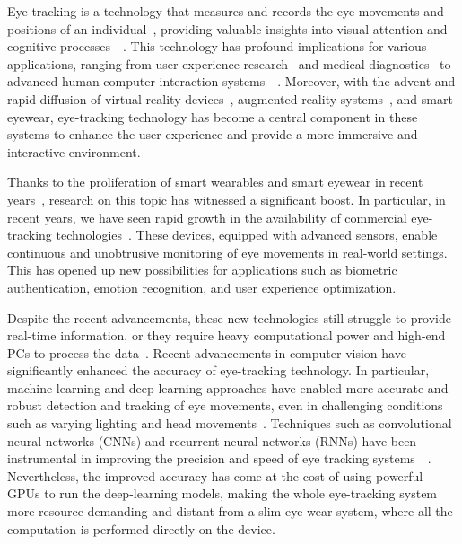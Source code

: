 Eye tracking is a technology that measures and records the eye movements and positions of an individual~\cite{andrychowicz2018basic}, providing valuable insights into visual attention and cognitive processes~\cite{Popa2015Reading}~\cite{Skaramagkas2021Review}. This technology has profound implications for various applications, ranging from user experience research~\cite{Burger2018Suitability} and medical diagnostics~\cite{Liu2021The} to advanced human-computer interaction systems~\cite{Bulling2010Toward}~\cite{Zhang2017Eye}. Moreover, with the advent and rapid diffusion of virtual reality devices~\cite{angelov2020modern}, augmented reality systems~\cite{arena2022overview}, and smart eyewear, eye-tracking technology has become a central component in these systems to enhance the user experience and provide a more immersive and interactive environment.

Thanks to the proliferation of smart wearables and smart eyewear in recent years~\cite{spil2019adoption}, research on this topic has witnessed a significant boost. In particular, in recent years, we have seen rapid growth in the availability of commercial eye-tracking technologies~\cite{KassnerPateraBulling}. These devices, equipped with advanced sensors, enable continuous and unobtrusive monitoring of eye movements in real-world settings. This has opened up new possibilities for applications such as biometric authentication, emotion recognition, and user experience optimization.

Despite the recent advancements, these new technologies still struggle to provide real-time information, or they require heavy computational power and high-end PCs to process the data~\cite{wan2021robust}. Recent advancements in computer vision have significantly enhanced the accuracy of eye-tracking technology. In particular, machine learning and deep learning approaches have enabled more accurate and robust detection and tracking of eye movements, even in challenging conditions such as varying lighting and head movements~\cite{zhu2007novel}. Techniques such as convolutional neural networks (CNNs) and recurrent neural networks (RNNs) have been instrumental in improving the precision and speed of eye tracking systems~\cite{fuhl2016pupilnet}~\cite{santini2018pure}. Nevertheless, the improved accuracy has come at the cost of using powerful GPUs to run the deep-learning models, making the whole eye-tracking system more resource-demanding and distant from a slim eye-wear system, where all the computation is performed directly on the device.

